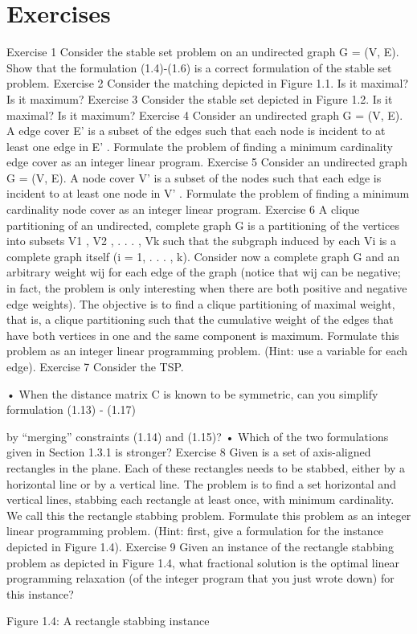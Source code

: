 \documentclass[titlepage]{book}
\begin{document}
\section*{Exercises}
Exercise 1
Consider the stable set problem on an undirected graph G = (V, E). Show that the formulation (1.4)-(1.6)
is a correct formulation of the stable set problem.
Exercise 2
Consider the matching depicted in Figure 1.1. Is it maximal? Is it maximum?
Exercise 3
Consider the stable set depicted in Figure 1.2. Is it maximal? Is it maximum?
Exercise 4
Consider an undirected graph G = (V, E). A edge cover E' is a subset of the edges such that each node is
incident to at least one edge in E' . Formulate the problem of finding a minimum cardinality edge cover
as an integer linear program.
Exercise 5
Consider an undirected graph G = (V, E). A node cover V' is a subset of the nodes such that each edge
is incident to at least one node in V' . Formulate the problem of finding a minimum cardinality node
cover as an integer linear program.
Exercise 6
A clique partitioning of an undirected, complete graph G is a partitioning of the vertices into subsets
V1 , V2 , . . . , Vk such that the subgraph induced by each Vi is a complete graph itself (i = 1, . . . , k). Consider
now a complete graph G and an arbitrary weight wij for each edge of the graph (notice that wij can be
negative; in fact, the problem is only interesting when there are both positive and negative edge weights).
The objective is to find a clique partitioning of maximal weight, that is, a clique partitioning such that
the cumulative weight of the edges that have both vertices in one and the same component is maximum.
Formulate this problem as an integer linear programming problem. (Hint: use a variable for each edge).
Exercise 7
Consider the TSP.

• When the distance matrix C is known to be symmetric, can you simplify formulation (1.13) - (1.17)

by “merging” constraints (1.14) and (1.15)?
• Which of the two formulations given in Section 1.3.1 is stronger?
Exercise 8
Given is a set of axis-aligned rectangles in the plane. Each of these rectangles needs to be stabbed, either
by a horizontal line or by a vertical line. The problem is to find a set horizontal and vertical lines, stabbing
each rectangle at least once, with minimum cardinality. We call this the rectangle stabbing problem.
Formulate this problem as an integer linear programming problem. (Hint: first, give a formulation for
the instance depicted in Figure 1.4).
Exercise 9
Given an instance of the rectangle stabbing problem as depicted in Figure 1.4, what fractional solution
is the optimal linear programming relaxation (of the integer program that you just wrote down) for this
instance?

Figure 1.4: A rectangle stabbing instance



\end{document}

